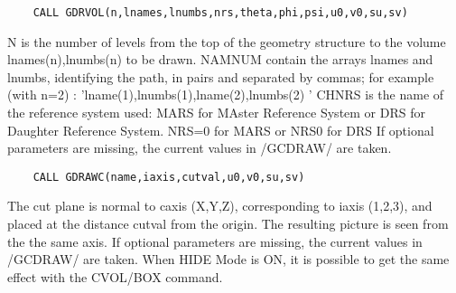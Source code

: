 \begin{verbatim}
    CALL GDRVOL(n,lnames,lnumbs,nrs,theta,phi,psi,u0,v0,su,sv)
\end{verbatim}
   \par
N is the number of levels from the top of the geometry structure to the 
   volume lnames(n),lnumbs(n) to be drawn.  NAMNUM contain the arrays lnames 
   and lnumbs, identifying the path, in pairs and separated by commas; for 
   example (with n=2) :  'lname(1),lnumbs(1),lname(2),lnumbs(2) ' CHNRS is the 
   name of the reference system used: MARS for MAster Reference System or DRS 
   for Daughter Reference System.  NRS=0 for MARS or NRS\BRA{}\KET{}0 for DRS 
   If optional parameters are missing, the current values in /GCDRAW/ are 
   taken.  

\ENDCMD


\BEGARG
{}
\ENDARG
{}
\ENDOPT

\begin{verbatim}
    CALL GDRAWC(name,iaxis,cutval,u0,v0,su,sv)
\end{verbatim}
   \par
The cut plane is normal to caxis (X,Y,Z), corresponding to iaxis (1,2,3), 
   and placed at the distance cutval from the origin.  The resulting picture 
   is seen from the the same axis.  If optional parameters are missing, the 
   current values in /GCDRAW/ are taken.  When HIDE Mode is ON, it is possible 
   to get the same effect with the CVOL/BOX command.  

\ENDCMD


\BEGARG
{}
\ENDARG

